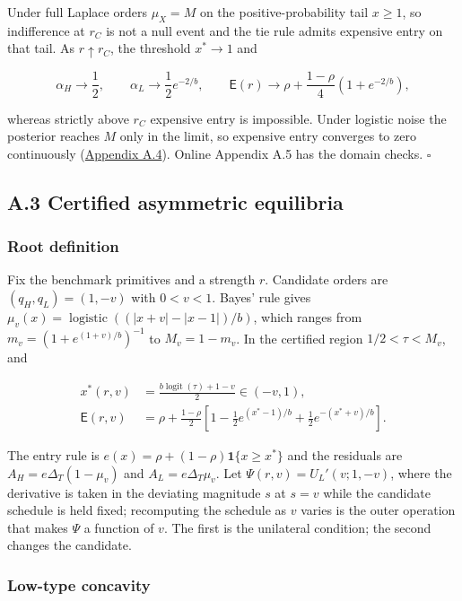 \documentclass[
  12pt,
]{article}
\begin{document}
Under full Laplace orders \(\mu_X=M\) on the positive-probability tail
\(x\ge1\), so indifference at \(r_C\) is not a null event and the tie
rule admits expensive entry on that tail. As \(r\uparrow r_C\), the
threshold \(x^*\to1\) and

\[
\alpha_H\to\frac12,\qquad\alpha_L\to\frac12e^{-2/b},\qquad
\mathsf E(r)\to\rho+\frac{1-\rho}{4}\left(1+e^{-2/b}\right),
\tag{A.14}\label{eq:paper-a-14}
\]

whereas strictly above \(r_C\) expensive entry is impossible. Under
logistic noise the posterior reaches \(M\) only in the limit, so
expensive entry converges to zero continuously
(\hyperref[pa-calculations]{Appendix A.4}). Online Appendix A.5 has the
domain checks. \(\square\)

\subsection{A.3 Certified asymmetric equilibria}\label{pa-certificate}

\subsubsection{Root definition}\label{root-definition}

Fix the benchmark primitives and a strength \(r\). Candidate orders are
\((q_H,q_L)=(1,-v)\) with \(0<v<1\). Bayes' rule gives
\(\mu_v(x)=\operatorname{logistic}((|x+v|-|x-1|)/b)\), which ranges from
\(m_v=(1+e^{(1+v)/b})^{-1}\) to \(M_v=1-m_v\). In the certified region
\(1/2<\tau<M_v\), and

\[
\begin{aligned}
x^*(r,v)&=\frac{b\operatorname{logit}(\tau)+1-v}{2}\in(-v,1),\\
\mathsf E(r,v)&=\rho+\frac{1-\rho}{2}
\left[1-\frac12e^{(x^*-1)/b}+\frac12e^{-(x^*+v)/b}\right].
\end{aligned}
\tag{A.15}\label{eq:paper-a-15}
\]

The entry rule is \(e(x)=\rho+(1-\rho)\mathbf1\{x\ge x^*\}\) and the
residuals are \(A_H=e\Delta_T(1-\mu_v)\) and \(A_L=e\Delta_T\mu_v\). Let
\(\Psi(r,v)=U_L'(v;1,-v)\), where the derivative is taken in the
deviating magnitude \(s\) at \(s=v\) while the candidate schedule is
held fixed; recomputing the schedule as \(v\) varies is the outer
operation that makes \(\Psi\) a function of \(v\). The first is the
unilateral condition; the second changes the candidate.

\subsubsection{Low-type concavity}\label{low-type-concavity}
\end{document}
